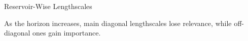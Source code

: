 \begin{frame}{Reservoir-Wise Lengthscales}
	\begin{figure}[htbp]
		\centering
		\tiny
		\setlength{} 
		\setlength{}
		\subfloat[$H=1$]{}\hspace{-1.3em}
		\subfloat[$H=14$]{}\hspace{-1.3em}
		\subfloat[$H=30$]{}
	\end{figure}
	\vspace{-2.0em}
	\begin{block}{}
	As the horizon increases, main diagonal lengthscales lose relevance, while off-diagonal ones gain importance.
	\end{block}
\end{frame}

